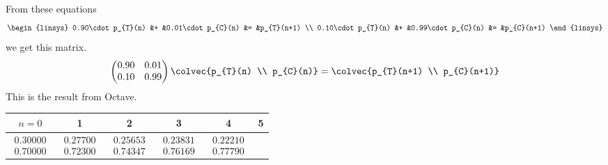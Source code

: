 \begin{ans}{4}
\begin{exparts}
\begin{center}
        \end{center}
      \end{exparts}
    
\end{ans}
\begin{ans}{5}
       \begin{exparts}
         \partsitem From these equations
           \begin{equation*}
             \begin{linsys}{2}
               0.90\cdot p_{T}(n)  &+  &0.01\cdot p_{C}(n) &= &p_{T}(n+1)   \\
               0.10\cdot p_{T}(n)  &+  &0.99\cdot p_{C}(n) &= &p_{C}(n+1)
             \end{linsys}
           \end{equation*}
           we get this matrix.
           \begin{equation*}
             \begin{pmatrix}
               0.90  &0.01  \\
               0.10  &0.99
             \end{pmatrix}
             \colvec{p_{T}(n) \\ p_{C}(n)}
             =
             \colvec{p_{T}(n+1) \\ p_{C}(n+1)}
           \end{equation*}
         \partsitem This is the result from Octave.
           \begin{center}
             \begin{tabular}{c|ccccc}
               $n=0$ &1  &2  &3  &4  &5  \\
               \hline
               $\begin{array}{c}  0.30000 \\ 0.70000 \end{array}$
               &$\begin{array}{c} 0.27700 \\ 0.72300 \end{array}$
               &$\begin{array}{c}  0.25653 \\ 0.74347 \end{array}$
               &$\begin{array}{c}  0.23831 \\ 0.76169 \end{array}$
               &$\begin{array}{c}  0.22210 \\ 0.77790 \end{array}$

\end{tabular}
\end{center}
\end{exparts}
\end{ans}
